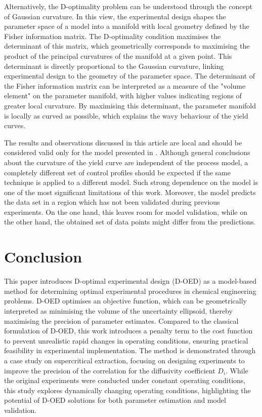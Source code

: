 \documentclass[a4paper,fleqn]{cas-dc}
\begin{document}
		Alternatively, the D-optimality problem can be understood through the concept of Gaussian curvature. In this view, the experimental design shapes the parameter space of a model into a manifold with local geometry defined by the Fisher information matrix. The D-optimality condition maximises the determinant of this matrix, which geometrically corresponds to maximising the product of the principal curvatures of the manifold at a given point. This determinant is directly proportional to the Gaussian curvature, linking experimental design to the geometry of the parameter space. The determinant of the Fisher information matrix can be interpreted as a measure of the "volume element" on the parameter manifold, with higher values indicating regions of greater local curvature. By maximising this determinant, the parameter manifold is locally as curved as possible, which explains the wavy behaviour of the yield curves.
		
		The results and observations discussed in this article are local and should be considered valid only for the model presented in \citet{Sliczniuk2024}. Although general conclusions about the curvature of the yield curve are independent of the process model, a completely different set of control profiles should be expected if the same technique is applied to a different model. Such strong dependence on the model is one of the most significant limitations of this work. Moreover, the model predicts the data set in a region which has not been validated during previous experiments. On the one hand, this leaves room for model validation, while on the other hand, the obtained set of data points might differ from the predictions.
		
		\section{Conclusion } \label{CH: Conclusion}
		This paper introduces D-optimal experimental design (D-OED) as a model-based method for determining optimal	experimental procedures in chemical engineering problems. D-OED optimises an objective function, which can be geometrically	interpreted as minimising the volume of the uncertainty ellipsoid, thereby maximising the precision of parameter estimates. Compared to the classical formulation of D-OED, this work introduces a penalty term to the cost function to prevent unrealistic rapid changes in operating conditions, ensuring practical feasibility in experimental	implementation. The method is demonstrated through a case study on supercritical extraction, focusing on designing experiments	to improve the precision of the correlation for the diffusivity coefficient $D_i$. While the original experiments were conducted under constant operating conditions, this study explores dynamically changing operating conditions, highlighting the potential of D-OED solutions for both parameter estimation and model validation.
		
\end{document}
